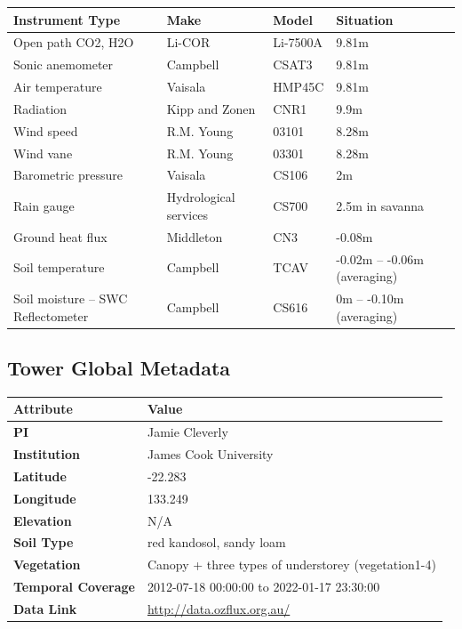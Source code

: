 \documentclass[11pt,a4paper]{article}
\begin{document}
\begin{longtable}{p{4.5cm}p{3.5cm}p{3.5cm}p{3.5cm}}
\toprule
\textbf{Instrument Type} & \textbf{Make} & \textbf{Model} & \textbf{Situation} \\
\midrule
\endhead
\bottomrule
\endfoot
Open path  CO2, H2O & Li-COR & Li-7500A & 9.81m \\
Sonic anemometer & Campbell & CSAT3 & 9.81m \\
Air temperature & Vaisala & HMP45C & 9.81m \\
Radiation & Kipp and Zonen & CNR1 & 9.9m \\
Wind speed & R.M. Young & 03101 & 8.28m \\
Wind vane & R.M. Young & 03301 & 8.28m \\
Barometric pressure & Vaisala & CS106 & 2m \\
Rain gauge & Hydrological services & CS700 & 2.5m in savanna \\
Ground heat flux & Middleton & CN3 & -0.08m \\
Soil temperature & Campbell & TCAV & -0.02m – -0.06m  (averaging) \\
Soil moisture – SWC  Reflectometer & Campbell & CS616 & 0m – -0.10m  (averaging) \\
\end{longtable}


\subsection*{Tower Global Metadata}

\begin{longtable}{p{4.5cm}p{10.5cm}}
\toprule
\textbf{Attribute} & \textbf{Value} \\
\midrule
\endhead
\bottomrule
\endfoot
\textbf{PI} & Jamie Cleverly \\
\textbf{Institution} & James Cook University \\
\textbf{Latitude} & -22.283 \\
\textbf{Longitude} & 133.249 \\
\textbf{Elevation} & N/A \\
\textbf{Soil Type} & red kandosol, sandy loam \\
\textbf{Vegetation} & Canopy + three types of understorey (vegetation1-4) \\
\textbf{Temporal Coverage} & 2012-07-18 00:00:00 to 2022-01-17 23:30:00 \\
\textbf{Data Link} & \url{http://data.ozflux.org.au/} \\
\end{longtable}
\end{document}
